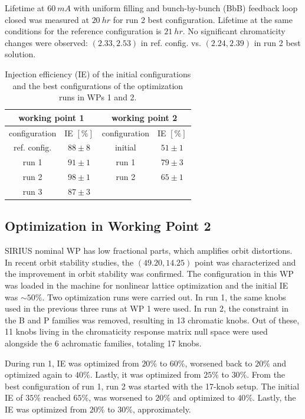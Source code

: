 \documentclass[a4paper,
               keeplastbox,   %
               ]{jacow}
\begin{document}
Lifetime at $60~\unit{mA}$ with uniform filling and bunch-by-bunch (BbB) feedback loop closed was measured at $20~\unit{hr}$ for run 2 best configuration. Lifetime at the same conditions for the reference configuration is $21~\unit{hr}$. No significant chromaticity changes were observed: $(2.33, 2.53)$ in ref. config. vs. $(2.24, 2.39)$ in run 2 best solution.  
\begin{table}[!h]
\centering
\caption{Injection efficiency (IE) of the initial configurations and the best configurations of the optimization runs in WPs 1 and 2.} 
\begin{tabular}{cccc}
\toprule
\multicolumn{2}{c}{working point 1}         & \multicolumn{2}{c}{working point 2}                \\ \midrule
configuration & IE $[\%]$ & configuration        & IE $[\%]$ \\ \hline
ref. config.  & $88\pm8$                & initial              & $51\pm1$                \\
run 1         & $91\pm1$                & run 1                & $79\pm3$                \\
run 2         & $98\pm1$                & run 2                & $65\pm1    $                \\
run 3         & $87\pm3$                & \multicolumn{1}{l}{} & \multicolumn{1}{l}{}        \\ \hline
\end{tabular}

\label{table1}
\end{table}


\subsection{Optimization in Working Point 2}
 SIRIUS nominal WP has low fractional parts, which amplifies orbit distortions. In recent orbit stability studies, the $(49.20, 14.25)$ point was characterized and the improvement in orbit stability was confirmed. The configuration in this WP was loaded in the machine for nonlinear lattice optimization and the initial IE was $\sim50\%$. Two optimization runs were carried out. In run 1, the same knobs used in the previous three runs at WP 1 were used. In run 2, the constraint in the B and P families was removed, resulting in 13 chromatic knobs. Out of these, 11 knobs living in the chromaticity response matrix null space were used alongside the 6 achromatic families, totaling 17 knobs. 
 
 During run 1, IE was optimized from $20\%$ to $60\%$, worsened back to $20\%$ and optimized again to $40\%$. Lastly, it was optimized from $25\%$ to $30\%$. From the best configuration  of run 1, run 2 was started with the 17-knob setup. The initial IE of $35\%$ reached $65\%$, was worsened to $20\%$ and optimized to $40\%$. Lastly, the IE was optimized from $20\%$ to $30\%$, approximately.
\end{document}
